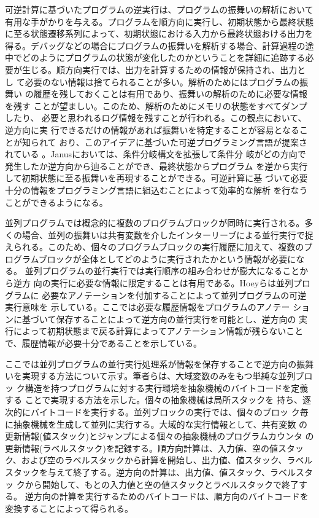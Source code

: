 \documentclass[submit,PRO]{ipsj}
\begin{document}
可逆計算に基づいたプログラムの逆実行は、プログラムの振舞いの解析において
有用な手がかりを与える。プログラムを順方向に実行し、初期状態から最終状態
に至る状態遷移系列によって、初期状態における入力から最終状態おける出力を
得る。デバッグなどの場合にプログラムの振舞いを解析する場合、計算過程の途
中でどのようにプログラムの状態が変化したのかということを詳細に追跡する必
要が生じる。順方向実行では、出力を計算するための情報が保持され、出力とし
て必要のない情報は捨てられることが多い。解析のためにはプログラムの振舞い
の履歴を残しておくことは有用であり、振舞いの解析のために必要な情報を残す
ことが望ましい。このため、解析のためにメモリの状態をすべてダンプしたり、
必要と思われるログ情報を残すことが行われる。この観点において、逆方向に実
行できるだけの情報があれば振舞いを特定することが容易となることが知られて
おり、このアイデアに基づいた可逆プログラミング言語が提案されている
\cite{Janus1,Janus2,RFUN}。Janusにおいては、条件分岐構文を拡張して条件分
岐がどの方向で発生したか逆方向から辿ることができ、最終状態からプログラム
を逆から実行して初期状態に至る振舞いを再現することができる。可逆計算に基
づいて必要十分の情報をプログラミング言語に組込むことによって効率的な解析
を行なうことができるようになる。

並列プログラムでは概念的に複数のプログラムブロックが同時に実行される。多
くの場合、並列の振舞いは共有変数を介したインターリーブによる並行実行で捉
えられる。このため、個々のプログラムブロックの実行履歴に加えて、複数のプ
ログラムブロックが全体としてどのように実行されたかという情報が必要になる。
並列プログラムの並行実行では実行順序の組み合わせが膨大になることから逆方
向の実行に必要な情報に限定することは有用である。Hoeyらは並列プログラムに
必要なアノテーションを付加することによって並列プログラムの可逆実行意味を
示している\cite{HIY18,H20}。ここでは必要な履歴情報をプログラムのアノテー
ションに基づいて保存することによって逆方向の並行実行を可能とし、逆方向の
実行によって初期状態まで戻る計算によってアノテーション情報が残らないこと
で、履歴情報が必要十分であることを示している。

ここでは並列プログラムの並行実行処理系が情報を保存することで逆方向の振舞
いを実現する方法について示す。筆者らは、大域変数のみをもつ単純な並列ブロッ
ク構造を持つプログラムに対する実行環境を抽象機械のバイトコードを定義する
ことで実現する方法を示した\cite{RC2020}。個々の抽象機械は局所スタックを
持ち、逐次的にバイトコードを実行する。並列ブロックの実行では、個々のブロッ
ク毎に抽象機械を生成して並列に実行する。大域的な実行情報として、共有変数
の更新情報(値スタック)とジャンプによる個々の抽象機械のプログラムカウンタ
の更新情報(ラベルスタック)を記録する。順方向計算は、入力値、空の値スタッ
ク、および空のラベルスタックから計算を開始し、出力値、値スタック、ラベル
スタックを与えて終了する。逆方向の計算は、出力値、値スタック、ラベルスタッ
クから開始して、もとの入力値と空の値スタックとラベルスタックで終了する。
逆方向の計算を実行するためのバイトコードは、順方向のバイトコードを
変換することによって得られる。
\end{document}
